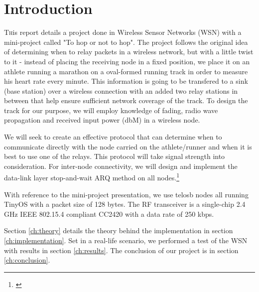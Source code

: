 \section{Introduction}\label{ch:introduction}

\lettrine[nindent=0em,lines=3]{T} his report details a project done in Wireless Sensor Networks (WSN) with a mini-project called "To hop or not to hop". The project follows the original idea of determining when to relay packets in a wireless network, but with a little twist to it - instead of placing the receiving node in a fixed position, we place it on an athlete running a marathon on a oval-formed running track in order to measure his heart rate every minute. This information is going to be transfered to a sink (base station) over a wireless connection with an added two relay stations in between that help ensure sufficient network coverage of the track. To design the track for our purpose, we will employ knowledge of fading, radio wave propagation and received input power (dbM) in a wireless node.

\noindent We will seek to create an effective protocol that can determine when to communicate directly with the node carried on the athlete/runner and when it is best to use one of the relays. This protocol will take signal strength into consideration. For inter-node connectivity, we will design and implement the data-link layer stop-and-wait ARQ method on all nodes.\footnote{\cite{Ieee}}

\noindent With reference to the mini-project presentation, we use telosb nodes all running TinyOS with a packet size of 128 bytes. The RF transceiver is a single-chip 2.4 GHz IEEE 802.15.4 compliant CC2420 with a data rate of 250 kbps.

\noindent Section \ref{ch:theory} details the theory behind the implementation in section \ref{ch:implementation}. Set in a real-life scenario, we performed a test of the WSN with results in section \ref{ch:results}. The conclusion of our project is in section \ref{ch:conclusion}.

